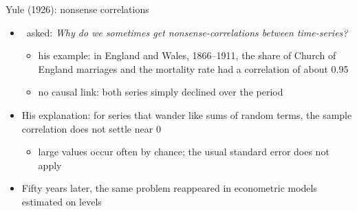 \begin{frame}{Yule (1926): nonsense correlations}
\itemsize{\small}
\begin{itemize}
    \item {}\ asked: \textit{Why do we sometimes get nonsense-correlations between time-series?}
    \begin{itemize}
        \item his example: in England and Wales, 1866--1911, the share of Church of England marriages and the mortality rate had a correlation of about 0.95
        \item no causal link: both series simply declined over the period
    \end{itemize}
    \item His explanation: for series that wander like sums of random terms, the sample correlation does not settle near 0
    \begin{itemize}
        \item large values occur often by chance; the usual standard error does not apply
    \end{itemize}
    \item Fifty years later, the same problem reappeared in econometric models estimated on levels
\end{itemize}
\end{frame}


